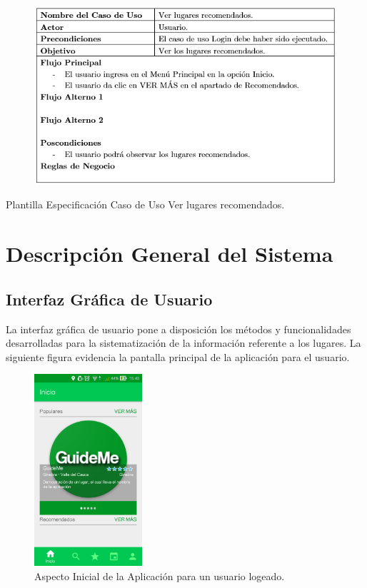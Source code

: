 \documentclass[12pt,letterpaper,openany]{book}
\begin{document}
\begin{table}[H]
\begin{center}
\begin{figure}[H]
\begin{center}
\includegraphics[width=13cm]{./imagenes/PCU/ver_lugares_recomendados}
\end{center}
\end{figure}
\end{center}
\caption{Plantilla Especificación Caso de Uso Ver lugares recomendados.}
\end{table}

\section{Descripción General del Sistema}
\subsection{Interfaz Gráfica de Usuario}
La interfaz gráfica de usuario pone a disposición los métodos y funcionalidades desarrolladas para la sistematización de la información referente a los lugares. La siguiente figura evidencia la pantalla principal de la aplicación para el usuario.

\begin{figure}[H]
\begin{center}
\includegraphics[width=4cm]{./imagenes/gui}
\caption{Aspecto Inicial de la Aplicación para un usuario logeado.}
\end{center}
\end{figure}
\end{document}
